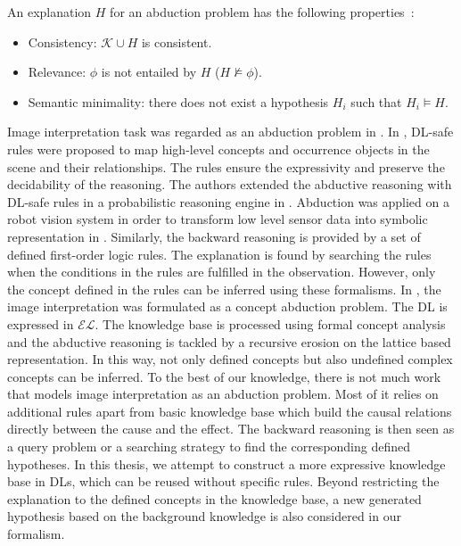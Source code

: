 \documentclass{article}
\begin{document}
An explanation $H$ for an abduction problem has the following properties~\cite{elsenbroich2006case}: 
\begin{itemize}
  \item Consistency: $\mathcal{K}\cup H$ is consistent.
  \item Relevance: $\phi$ is not entailed by $H$ ($H\nvDash \phi$).
  \item Semantic minimality: there does not exist a hypothesis $H_i$ such that $H_i\vDash H$.
 \end{itemize}
Image interpretation task was regarded as an abduction problem in \cite{atif2014explanatory,gries2010probabilistic,neumann2008scene,shanahan2005perception}.
In \cite{neumann2008scene}, DL-safe rules were proposed to map high-level concepts and occurrence objects in the scene and their relationships.
The rules ensure the expressivity and preserve the decidability of the reasoning. The authors extended the abductive reasoning with DL-safe rules 
in a probabilistic reasoning engine in \cite{gries2010probabilistic}.
Abduction was applied on a robot vision system in order to transform low level sensor data into symbolic representation in \cite{shanahan2005perception}.
Similarly, the backward reasoning is provided by a set of defined first-order logic rules.
The explanation is found by searching the rules when the conditions in the rules are fulfilled in the observation.
However, only the concept defined in the rules can be inferred using these formalisms.
In \cite{atif2014explanatory}, the image interpretation was formulated as a concept abduction problem.
The DL is expressed in $\mathcal{EL}$. The knowledge base is processed using formal concept analysis and the abductive reasoning is tackled
by a recursive erosion on the lattice based representation. In this way, not only defined concepts but also undefined complex concepts can be inferred.
To the best of our knowledge, there is not much work that models image interpretation as an abduction problem.
Most of it relies on additional rules apart from basic knowledge base which build the causal relations directly between the cause and the effect. 
The backward reasoning is then seen as a query problem or a searching strategy to find the corresponding defined hypotheses.
In this thesis, we attempt to construct a more expressive knowledge base in DLs, which can be reused without specific rules.
Beyond restricting the explanation to the defined concepts in the knowledge base, a new generated hypothesis based on the background knowledge is also considered in our formalism. 
\end{document}
